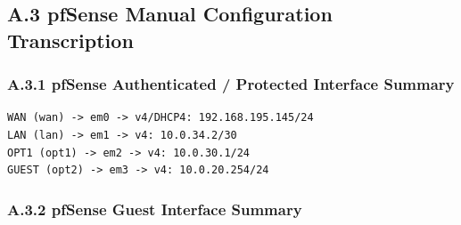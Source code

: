 \documentclass[11pt]{article}
\begin{document}

\subsection{A.3 pfSense Manual Configuration Transcription}
\label{sec:appendix-a-pfsense-manual-configuration-transcription}


\subsubsection{A.3.1 pfSense Authenticated / Protected Interface Summary}
\label{sec:appendix-a-pfsense-authenticated-interface-summary}

\begin{verbatim}
WAN (wan) -> em0 -> v4/DHCP4: 192.168.195.145/24
LAN (lan) -> em1 -> v4: 10.0.34.2/30
OPT1 (opt1) -> em2 -> v4: 10.0.30.1/24
GUEST (opt2) -> em3 -> v4: 10.0.20.254/24
\end{verbatim}


\subsubsection{A.3.2 pfSense Guest Interface Summary}
\label{sec:appendix-a-pfsense-guest-interface-summary}
\end{document}
